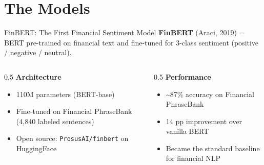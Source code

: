 \documentclass[aspectratio=169]{beamer}
\begin{document}
\section{The Models}

\begin{frame}{FinBERT: The First Financial Sentiment Model}
\textbf{FinBERT} (Araci, 2019) = BERT pre-trained on financial text and fine-tuned for 3-class sentiment (positive / negative / neutral).
\vspace{0.3cm}
\begin{columns}[T]
\begin{column}{0.5\textwidth}
\textbf{Architecture}
\begin{itemize}\small
  \item 110M parameters (BERT-base)
  \item Fine-tuned on Financial PhraseBank (4,840 labeled sentences)
  \item Open source: \texttt{ProsusAI/finbert} on HuggingFace
\end{itemize}
\end{column}
\begin{column}{0.5\textwidth}
\textbf{Performance}
\begin{itemize}\small
  \item \textasciitilde87\% accuracy on Financial PhraseBank
  \item 14 pp improvement over vanilla BERT
  \item Became the standard baseline for financial NLP
\end{itemize}
\end{column}
\end{columns}
\end{frame}
\end{document}
